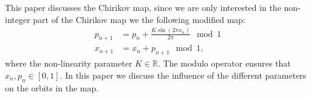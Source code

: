 
This paper discusses the Chirikov map, since we are only interested in the non-integer part of the Chirikov map we the following modified map:
\begin{subequations}\label{eq:chirikov}
	\begin{align}
		\label{eq:chirikov:p} p_{n + 1} &= p_n + \frac{K \sin \left(  2 \pi x_n \right)}{2 \pi} \mod 1 \\
		\label{eq:chirikov:x} x_{n + 1} &= x_n + p_{n + 1} \mod 1,
	\end{align}
\end{subequations}	
where the non-linearity parameter $K \in \mathbb{R}$. The modulo operator ensures that $x_n, p_n \in \left[ 0, 1 \right]$. In this paper we discuss the influence of the different parameters on the orbits in the map.